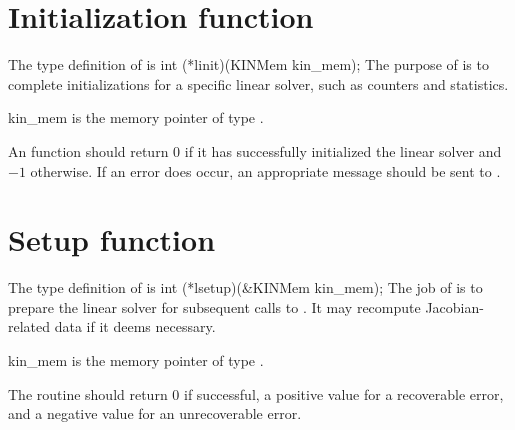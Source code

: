 
\section{Initialization function}
The type definition of  is
{
  int (*linit)(KINMem kin\_mem);
}
{
  The purpose of  is to complete initializations for      
  a specific linear solver, such as counters and statistics.        
}
{
  \begin{args}
  \item[kin\_mem]
    is the {\kinsol} memory pointer of type .
  \end{args}
}
{
  An  function should return $0$ if it 
  has successfully initialized the {\kinsol} linear solver and 
  $-1$ otherwise. 
}
{
  If an error does occur, an appropriate message should be sent 
  to .
}


\section{Setup function} 
The type definition of  is
{
  int (*lsetup)(&KINMem kin\_mem);
}
{
  The job of  is to prepare the linear solver for subsequent 
  calls to . It may recompute Jacobian-related data if it 
  deems necessary. 
}
{
  \begin{args}
  \item[kin\_mem]
    is the {\kinsol} memory pointer of type .
  \end{args}
}
{
  The  routine should return $0$ if successful,            
  a positive value for a recoverable error, and a negative value  
  for an unrecoverable error.  
}
{}


